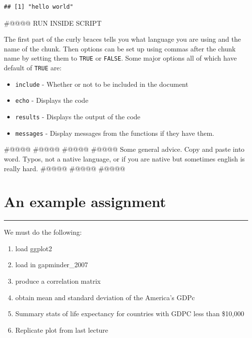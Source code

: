 \documentclass[
]{article}
\providecommand{\tightlist}{%
  \setlength{\itemsep}{0pt}\setlength{\parskip}{0pt}}
\begin{document}
\begin{verbatim}
## [1] "hello world"
\end{verbatim}

\#@@@@ RUN INSIDE SCRIPT

The first part of the curly braces tells you what language you are using
and the name of the chunk. Then options can be set up using commas after
the chunk name by setting them to \texttt{TRUE} or \texttt{FALSE}. Some
major options all of which have default of \texttt{TRUE} are:

\begin{itemize}
\tightlist
\item
  \texttt{include} - Whether or not to be included in the document
\item
  \texttt{echo} - Displays the code
\item
  \texttt{results} - Displays the output of the code
\item
  \texttt{messages} - Display messages from the functions if they have
  them.
\end{itemize}

\#@@@@ \#@@@@ \#@@@@ \#@@@@ Some general advice. Copy and paste into
word. Typos, not a native language, or if you are native but sometimes
english is really hard. \#@@@@ \#@@@@ \#@@@@

\hypertarget{an-example-assignment}{%
\section{An example assignment}\label{an-example-assignment}}

\begin{center}\rule{0.5\linewidth}{0.5pt}\end{center}

We must do the following:

\begin{enumerate}
\def\labelenumi{\arabic{enumi}.}
\tightlist
\item
  load ggplot2
\item
  load in gapminder\_2007
\item
  produce a correlation matrix
\item
  obtain mean and standard deviation of the America's GDPc
\item
  Summary stats of life expectancy for countries with GDPC less than
  \$10,000
\item
  Replicate plot from last lecture
\end{enumerate}
\end{document}

